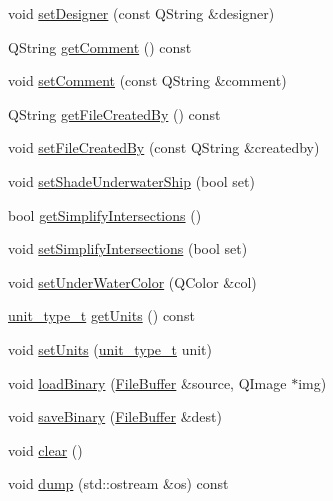 \begin{DoxyCompactItemize}
\item 
void \hyperlink{classShipCAD_1_1ProjectSettings_abde123a71eba642ff1dbd62d547aa684}{set\-Designer} (const Q\-String \&designer)
\item 
Q\-String \hyperlink{classShipCAD_1_1ProjectSettings_a7687e8e358e8deb57e363ad8e5cfef17}{get\-Comment} () const 
\item 
void \hyperlink{classShipCAD_1_1ProjectSettings_a64e942847dd0838f04dc4ec32e9bc30e}{set\-Comment} (const Q\-String \&comment)
\item 
Q\-String \hyperlink{classShipCAD_1_1ProjectSettings_a8db64934b729181fbf65b767f6260bff}{get\-File\-Created\-By} () const 
\item 
void \hyperlink{classShipCAD_1_1ProjectSettings_a326e18ff53ba0f916d4d8cfab5a2d17f}{set\-File\-Created\-By} (const Q\-String \&createdby)
\item 
void \hyperlink{classShipCAD_1_1ProjectSettings_a0f40362f42e6dfd4147d69573c00988f}{set\-Shade\-Underwater\-Ship} (bool set)
\item 
bool \hyperlink{classShipCAD_1_1ProjectSettings_a2e5f2bfb546885af0af8d857198b8cc9}{get\-Simplify\-Intersections} ()
\item 
void \hyperlink{classShipCAD_1_1ProjectSettings_a138264f53da99f6a1765ea7aec95096a}{set\-Simplify\-Intersections} (bool set)
\item 
void \hyperlink{classShipCAD_1_1ProjectSettings_a06b1260b284a988fb62b49f7ab4d5bf3}{set\-Under\-Water\-Color} (Q\-Color \&col)
\item 
\hyperlink{namespaceShipCAD_ac6a7a28b4b063771afae92decb602da5}{unit\-\_\-type\-\_\-t} \hyperlink{classShipCAD_1_1ProjectSettings_af9e707de58afaa87f639c2426dbb1161}{get\-Units} () const 
\item 
void \hyperlink{classShipCAD_1_1ProjectSettings_a2310573735d3c0ad17ca290bca083f99}{set\-Units} (\hyperlink{namespaceShipCAD_ac6a7a28b4b063771afae92decb602da5}{unit\-\_\-type\-\_\-t} unit)
\item 
void \hyperlink{classShipCAD_1_1ProjectSettings_af6012d62299292d0757955b14c6bd854}{load\-Binary} (\hyperlink{classShipCAD_1_1FileBuffer}{File\-Buffer} \&source, Q\-Image $\ast$img)
\item 
void \hyperlink{classShipCAD_1_1ProjectSettings_aebda4677da789819020d1ea1623ec035}{save\-Binary} (\hyperlink{classShipCAD_1_1FileBuffer}{File\-Buffer} \&dest)
\item 
void \hyperlink{classShipCAD_1_1ProjectSettings_a9e0ce44e6aea8e57608baee2a3b05827}{clear} ()
\item 
void \hyperlink{classShipCAD_1_1ProjectSettings_a9caa9e15bc03de5b6092c419a58a87e8}{dump} (std\-::ostream \&os) const 
\end{DoxyCompactItemize}


